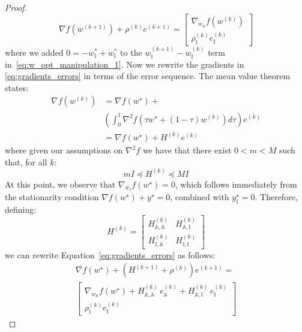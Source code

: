 \documentclass[letterpaper, 10 pt, conference]{ieeeconf}  %
\begin{document}
\begin{proof}
\begin{equation}
\nabla f(w^{(k+1)}) + \rho^{(k)} e^{(k+1)} = \begin{bmatrix}
    \nabla_{w_{\mathbb{A}}}f(w^{(k)}) \\
    \rho_{\mathbb{I}}^{(k)} e^{(k)}_{\mathbb{I}}
\end{bmatrix}
\end{equation}
where we added $0 = -w_\mathbb{I}^{*} + w_\mathbb{I}^{*}$ to the $w_\mathbb{I}^{(k+1)} - w_\mathbb{I}^{(k)}$ term in~\eqref{eq:w_opt_manipulation_1}.
Now we rewrite the gradients in \eqref{eq:gradients_errors} in terms of the error sequence. The mean value theorem states:
\begin{equation}
\begin{aligned}
    \nabla f(w^{(k)}) &= \nabla f(w^{\star}) + \\
    &\left( \int_0^1 \nabla^2 f(\tau w^{\star} + (1 - \tau) w^{(k)}) d\tau \right) e^{(k)} \\
    &= \nabla f(w^{\star}) +  H^{(k)} e^{(k)}
\end{aligned}
\end{equation}
where given our assumptions on $\nabla^2f$ we have that there exist $0 < m < M$ such that, for all $k$:
\begin{equation}
\label{eq:H_bounds}
mI \preceq H^{(k)} \preceq M I
\end{equation}
At this point, we observe that $\nabla_{w_\mathbb{I}}f(w^{\star}) = 0$, which follows immediately from the stationarity condition $\nabla f(w^{\star}) + y^{\star} = 0$, combined with $y_\mathbb{I}^{\star} = 0$. Therefore, defining:
\begin{equation}
    H^{(k)} = \begin{bmatrix}
        H_{\mathbb{A}, \mathbb{A}}^{(k)} & H_{\mathbb{A},\mathbb{I}}^{(k)} \\
        H_{\mathbb{I}, \mathbb{A}}^{(k)} & H_{\mathbb{I}, \mathbb{I}}^{(k)}
    \end{bmatrix}
\end{equation}
we can rewrite Equation~\eqref{eq:gradients_errors} as follows:
\begin{equation}
\begin{aligned}
    \nabla f(w^{{\star}}) + (H^{(k+1)} + \rho^{(k)}) e^{(k+1)} = \\
    \begin{bmatrix} \nabla_{w_{\mathbb{A}}}f(w^{\star}) + 
    H^{(k)}_{\mathbb{A},\mathbb{A}}\, e_{\mathbb{A}}^{(k)} + H_{\mathbb{A}, \mathbb{I}}^{(k)} \,e_{\mathbb{I}}^{(k)} \\
    \rho_{\mathbb{I}}^{(k)} e_{\mathbb{I}}^{(k)}

\end{bmatrix}
\end{aligned}
\end{equation}
\end{proof}
\end{document}

